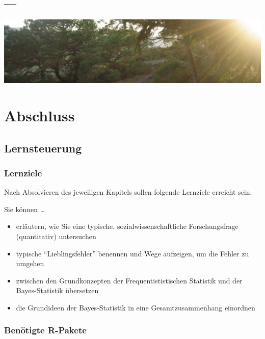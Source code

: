 \documentclass[
  a4paper,
  DIV=11]{scrreprt}
\providecommand{\tightlist}{%
  \setlength{\itemsep}{0pt}\setlength{\parskip}{0pt}}\usepackage{longtable,booktabs,array}
\theoremstyle{definition}
\theoremstyle{remark}
\begin{document}
\hypertarget{section-10}{%
\section{---}\label{section-10}}

\includegraphics[width=1\textwidth,height=\textheight]{./img/outro-11.jpg}


\hypertarget{abschluss-1}{%
\chapter{Abschluss}\label{abschluss-1}}

\hypertarget{lernsteuerung-10}{%
\section{Lernsteuerung}\label{lernsteuerung-10}}

\hypertarget{lernziele-11}{%
\subsection{Lernziele}\label{lernziele-11}}

Nach Absolvieren des jeweiligen Kapitels sollen folgende Lernziele
erreicht sein.

Sie können \ldots{}

\begin{itemize}
\tightlist
\item
  erläutern, wie Sie eine typische, sozialwissenschaftliche
  Forschungsfrage (quantitativ) untersuchen
\item
  typische ``Lieblingsfehler'' benennen und Wege aufzeigen, um die
  Fehler zu umgehen
\item
  zwischen den Grundkonzepten der Frequentististischen Statistik und der
  Bayes-Statistik übersetzen
\item
  die Grundideen der Bayes-Statistik in eine Gesamtzusammenhang
  einordnen
\end{itemize}

\hypertarget{benuxf6tigte-r-pakete-6}{%
\subsection{Benötigte R-Pakete}\label{benuxf6tigte-r-pakete-6}}
\end{document}
